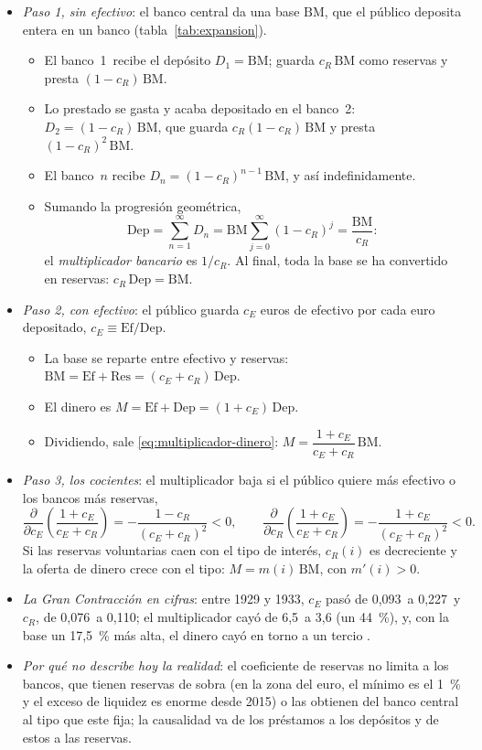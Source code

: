 \documentclass[11pt]{article}
\begin{document}
\begin{itemize}
\item \emph{Paso 1, sin efectivo}: el banco central da una base $\mathrm{BM}$, que el público deposita entera en un banco (tabla~\ref{tab:expansion}).
  \begin{itemize}
  \item El banco~1~recibe el depósito $D_1=\mathrm{BM}$; guarda $c_R\,\mathrm{BM}$ como reservas y presta $(1-c_R)\,\mathrm{BM}$.
  \item Lo prestado se gasta y acaba depositado en el banco~2: $D_2=(1-c_R)\,\mathrm{BM}$, que guarda $c_R(1-c_R)\,\mathrm{BM}$ y presta $(1-c_R)^2\,\mathrm{BM}$.
  \item El banco~$n$ recibe $D_n=(1-c_R)^{n-1}\,\mathrm{BM}$, y así indefinidamente.
  \item Sumando la progresión geométrica,
    $$\mathrm{Dep}=\sum_{n=1}^{\infty}D_n=\mathrm{BM}\sum_{j=0}^{\infty}(1-c_R)^j=\frac{\mathrm{BM}}{c_R} :$$
    el \emph{multiplicador bancario} es $1/c_R$. Al final, toda la base se ha convertido en reservas: $c_R\,\mathrm{Dep}=\mathrm{BM}$.
  \end{itemize}
\item \emph{Paso 2, con efectivo}: el público guarda $c_E$ euros de efectivo por cada euro depositado, $c_E\equiv\mathrm{Ef}/\mathrm{Dep}$.
  \begin{itemize}
  \item La base se reparte entre efectivo y reservas: $\mathrm{BM}=\mathrm{Ef}+\mathrm{Res}=(c_E+c_R)\,\mathrm{Dep}$.
  \item El dinero es $M=\mathrm{Ef}+\mathrm{Dep}=(1+c_E)\,\mathrm{Dep}$.
  \item Dividiendo, sale \eqref{eq:multiplicador-dinero}: $M=\dfrac{1+c_E}{c_E+c_R}\,\mathrm{BM}$.
  \end{itemize}
\item \emph{Paso 3, los cocientes}: el multiplicador baja si el público quiere más efectivo o los bancos más reservas,
  $$\frac{\partial}{\partial c_E}\left(\frac{1+c_E}{c_E+c_R}\right)=-\frac{1-c_R}{(c_E+c_R)^2}<0,\qquad \frac{\partial}{\partial c_R}\left(\frac{1+c_E}{c_E+c_R}\right)=-\frac{1+c_E}{(c_E+c_R)^2}<0 .$$
  Si las reservas voluntarias caen con el tipo de interés, $c_R(i)$ es decreciente y la oferta de dinero crece con el tipo: $M=m(i)\,\mathrm{BM}$, con $m'(i)>0$.\findemo
\item \emph{La Gran Contracción en cifras}\nocite{FriedmanSchwartz1963Monetary}: entre 1929 y 1933, $c_E$ pasó de 0,093~a 0,227~y $c_R$, de 0,076~a 0,110; el multiplicador cayó de 6,5~a 3,6 (un 44~\%), y, con la base un 17,5~\% más alta, el dinero cayó en torno a un tercio .
\item \emph{Por qué no describe hoy la realidad}: el coeficiente de reservas no limita a los bancos, que tienen reservas de sobra (en la zona del euro, el mínimo es el 1~\% y el exceso de liquidez es enorme desde 2015) o las obtienen del banco central al tipo que este fija; la causalidad va de los préstamos a los depósitos y de estos a las reservas\nocite{McLeayRadiaThomas2014Money}.
\end{itemize}
\end{document}
